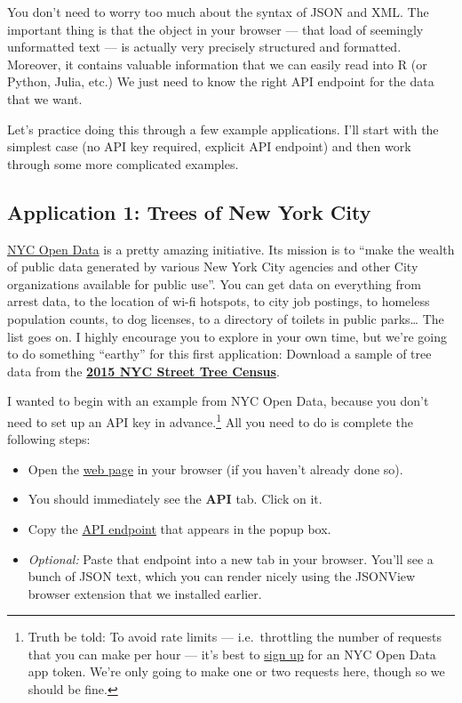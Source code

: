 \documentclass[
]{article}
\providecommand{\tightlist}{%
  \setlength{\itemsep}{0pt}\setlength{\parskip}{0pt}}
\begin{document}
You don't need to worry too much about the syntax of JSON and XML. The
important thing is that the object in your browser --- that load of
seemingly unformatted text --- is actually very precisely structured and
formatted. Moreover, it contains valuable information that we can easily
read into R (or Python, Julia, etc.) We just need to know the right API
endpoint for the data that we want.

Let's practice doing this through a few example applications. I'll start
with the simplest case (no API key required, explicit API endpoint) and
then work through some more complicated examples.

\hypertarget{application-1-trees-of-new-york-city}{%
\subsection{Application 1: Trees of New York
City}\label{application-1-trees-of-new-york-city}}

\href{https://opendata.cityofnewyork.us/}{NYC Open Data} is a pretty
amazing initiative. Its mission is to ``make the wealth of public data
generated by various New York City agencies and other City organizations
available for public use''. You can get data on everything from arrest
data, to the location of wi-fi hotspots, to city job postings, to
homeless population counts, to dog licenses, to a directory of toilets
in public parks\ldots{} The list goes on. I highly encourage you to
explore in your own time, but we're going to do something ``earthy'' for
this first application: Download a sample of tree data from the
\href{https://data.cityofnewyork.us/Environment/2015-Street-Tree-Census-Tree-Data/uvpi-gqnh}{\textbf{2015
NYC Street Tree Census}}.

I wanted to begin with an example from NYC Open Data, because you don't
need to set up an API key in advance.\footnote{Truth be told: To avoid
  rate limits --- i.e.~throttling the number of requests that you can
  make per hour --- it's best to
  \href{https://data.cityofnewyork.us/profile/app_tokens}{sign up} for
  an NYC Open Data app token. We're only going to make one or two
  requests here, though so we should be fine.} All you need to do is
complete the following steps:

\begin{itemize}
\tightlist
\item
  Open the
  \href{https://data.cityofnewyork.us/Environment/2015-Street-Tree-Census-Tree-Data/uvpi-gqnh}{web
  page} in your browser (if you haven't already done so).
\item
  You should immediately see the \textbf{API} tab. Click on it.
\item
  Copy the
  \href{https://data.cityofnewyork.us/resource/nwxe-4ae8.json}{API
  endpoint} that appears in the popup box.
\item
  \emph{Optional:} Paste that endpoint into a new tab in your browser.
  You'll see a bunch of JSON text, which you can render nicely using the
  JSONView browser extension that we installed earlier.
\end{itemize}
\end{document}
